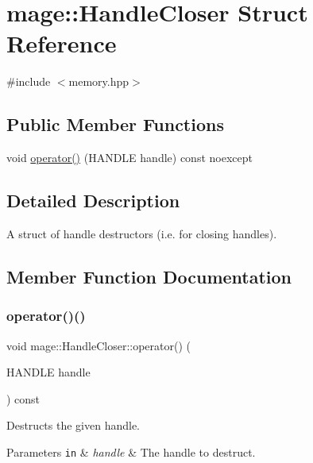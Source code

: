 \hypertarget{structmage_1_1_handle_closer}{}\section{mage\+:\+:Handle\+Closer Struct Reference}
\label{structmage_1_1_handle_closer}


{\ttfamily \#include $<$memory.\+hpp$>$}

\subsection*{Public Member Functions}
\begin{DoxyCompactItemize}
\item 
void \mbox{\hyperlink{structmage_1_1_handle_closer_a5fb69ac519eb5ec7a2439fc12d46d075}{operator()}} (H\+A\+N\+D\+LE handle) const noexcept
\end{DoxyCompactItemize}


\subsection{Detailed Description}
A struct of handle destructors (i.\+e. for closing handles). 

\subsection{Member Function Documentation}
\mbox{\label{structmage_1_1_handle_closer_a5fb69ac519eb5ec7a2439fc12d46d075}} 
\subsubsection{\texorpdfstring{operator()()}{operator()()}}
{\footnotesize\ttfamily void mage\+::\+Handle\+Closer\+::operator() (\begin{DoxyParamCaption}\item[{H\+A\+N\+D\+LE}]{handle }\end{DoxyParamCaption}) const\hspace{0.3cm}{\ttfamily [noexcept]}}

Destructs the given handle.


\begin{DoxyParams}[1]{Parameters}
\mbox{\tt in}  & {\em handle} & The handle to destruct. \\
\hline
\end{DoxyParams}
